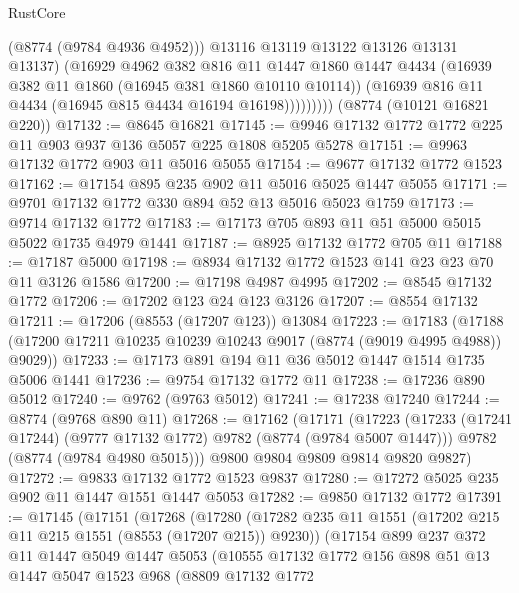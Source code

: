 \begin{lexlean}{RustCore}
\begin{coremodule}
                    (@8774 (@9784 @4936 @4952)))
                  @13116
                  @13119
                  @13122
                  @13126
                  @13131
                  @13137)
                (@16929
                  @4962
                  @382
                  @816
                  @11
                  @1447
                  @1860
                  @1447
                  @4434
                  (@16939 @382 @11 @1860 (@16945 @381 @1860 @10110 @10114))
                  (@16939 @816 @11 @4434 (@16945 @815 @4434 @16194 @16198)))))))))
    (@8774 (@10121 @16821 @220))
@17132 := @8645 @16821
@17145 := @9946 @17132 @1772 @1772 @225 @11 @903 @937 @136 @5057 @225 @1808 @5205 @5278
@17151 := @9963 @17132 @1772 @903 @11 @5016 @5055
@17154 := @9677 @17132 @1772 @1523
@17162 := @17154 @895 @235 @902 @11 @5016 @5025 @1447 @5055
@17171 := @9701 @17132 @1772 @330 @894 @52 @13 @5016 @5023 @1759
@17173 := @9714 @17132 @1772
@17183 := @17173 @705 @893 @11 @51 @5000 @5015 @5022 @1735 @4979 @1441
@17187 := @8925 @17132 @1772 @705 @11
@17188 := @17187 @5000
@17198 := @8934 @17132 @1772 @1523 @141 @23 @23 @70 @11 @3126 @1586
@17200 := @17198 @4987 @4995
@17202 := @8545 @17132 @1772
@17206 := @17202 @123 @24 @123 @3126
@17207 := @8554 @17132
@17211 := @17206 (@8553 (@17207 @123)) @13084
@17223 := @17183
    (@17188 (@17200 @17211 @10235 @10239 @10243 @9017 (@8774 (@9019 @4995 @4988)) @9029))
@17233 := @17173 @891 @194 @11 @36 @5012 @1447 @1514 @1735 @5006 @1441
@17236 := @9754 @17132 @1772 @11
@17238 := @17236 @890 @5012
@17240 := @9762 (@9763 @5012)
@17241 := @17238 @17240
@17244 := @8774 (@9768 @890 @11)
@17268 := @17162
    (@17171
      (@17223
        (@17233 (@17241 @17244) (@9777 @17132 @1772) @9782 (@8774 (@9784 @5007 @1447)))
        @9782
        (@8774 (@9784 @4980 @5015)))
      @9800
      @9804
      @9809
      @9814
      @9820
      @9827)
@17272 := @9833 @17132 @1772 @1523 @9837
@17280 := @17272 @5025 @235 @902 @11 @1447 @1551 @1447 @5053
@17282 := @9850 @17132 @1772
@17391 := @17145
    (@17151
      (@17268
        (@17280
          (@17282 @235 @11 @1551 (@17202 @215 @11 @215 @1551 (@8553 (@17207 @215)) @9230))
          (@17154
            @899
            @237
            @372
            @11
            @1447
            @5049
            @1447
            @5053
            (@10555
              @17132
              @1772
              @156
              @898
              @51
              @13
              @1447
              @5047
              @1523
              @968
              (@8809
                @17132
                @1772

\end{coremodule}
\end{lexlean}
